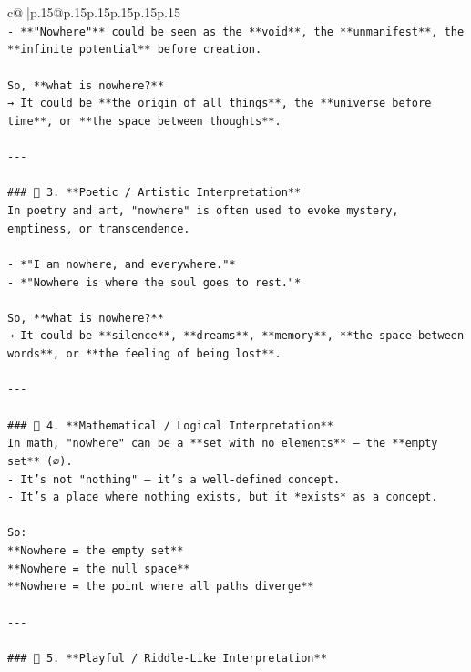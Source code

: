 \documentclass{article}
\begin{document}
{\begin{supertabular}{c@{$\;$}|p{.15\linewidth}@{}p{.15\linewidth}p{.15\linewidth}p{.15\linewidth}p{.15\linewidth}p{.15\linewidth}}
{{{\\ 
\texttt{{-} **"Nowhere"** could be seen as the **void**, the **unmanifest**, the **infinite potential** before creation.} \\
\\ 
\texttt{So, **what is nowhere?**  } \\
\texttt{→ It could be **the origin of all things**, the **universe before time**, or **the space between thoughts**.} \\
\\ 
\texttt{{-}{-}{-}} \\
\\ 
\texttt{\#\#\# 🔹 3. **Poetic / Artistic Interpretation**  } \\
\texttt{In poetry and art, "nowhere" is often used to evoke mystery, emptiness, or transcendence.} \\
\\ 
\texttt{{-} *"I am nowhere, and everywhere."*  } \\
\texttt{{-} *"Nowhere is where the soul goes to rest."*} \\
\\ 
\texttt{So, **what is nowhere?**  } \\
\texttt{→ It could be **silence**, **dreams**, **memory**, **the space between words**, or **the feeling of being lost**.} \\
\\ 
\texttt{{-}{-}{-}} \\
\\ 
\texttt{\#\#\# 🔹 4. **Mathematical / Logical Interpretation**  } \\
\texttt{In math, "nowhere" can be a **set with no elements** — the **empty set** (∅).  } \\
\texttt{{-} It’s not "nothing" — it’s a well{-}defined concept.} \\
\texttt{{-} It’s a place where nothing exists, but it *exists* as a concept.} \\
\\ 
\texttt{So:  } \\
\texttt{**Nowhere = the empty set**  } \\
\texttt{**Nowhere = the null space**  } \\
\texttt{**Nowhere = the point where all paths diverge**} \\
\\ 
\texttt{{-}{-}{-}} \\
\\ 
\texttt{\#\#\# 🔹 5. **Playful / Riddle{-}Like Interpretation**  } \\
}}}
\end{supertabular}}
\end{document}
